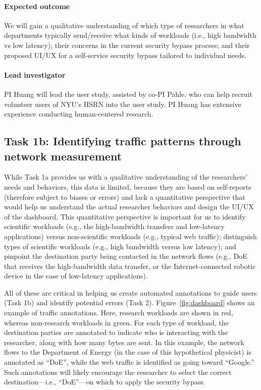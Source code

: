 \paragraph{Expected outcome} We will gain a qualitative understanding of which type of researchers in what departments typically send/receive what kinds of workloads (i.e., high bandwidth vs low latency); their concerns in the current security bypass process; and their proposed UI/UX for a self-service security bypass tailored to individual needs.



\paragraph{Lead investigator}
PI Huang will lead the user study, assisted by co-PI Pahle, who can help recruit volunteer users of NYU's HSRN into the user study. PI Huang has extensive experience conducting human-centered research.










\subsection{Task 1b: Identifying traffic patterns through network measurement}

While Task 1a provides us with a qualitative understanding of the researchers' needs and behaviors, this data is limited, because they are based on self-reports (therefore subject to biases or errors) and lack a quantitative perspective that would help us understand the actual researcher behaviors and design the UI/UX of the dashboard.
This quantitative perspective is important for us to identify scientific workloads (e.g., the high-bandwidth transfers and low-latency applications) versus non-scientific workloads (e.g., typical web traffic); distinguish types of scientific workloads (e.g., high bandwidth versus low latency); and pinpoint the destination party being contacted in the network flows (e.g., DoE that receives the high-bandwidth data transfer, or the Internet-connected robotic device in the case of low-latency applications).

All of these are critical in helping us create automated annotations to guide users (Task 1b) and identify potential errors (Task 2). Figure~\ref{fig:dashboard} shows an example of traffic annotations. Here, research workloads are shown in red, whereas non-research workloads in green. For each type of workload, the destination parties are annotated to indicate who is interacting with the researcher, along with how many bytes are sent. In this example, the network flows to the Department of Energy (in the case of this hypothetical physicist) is annotated as ``DoE'', while the web traffic is identified as going toward ``Google.'' Such annotations will likely encourage the researcher to select the correct destination---i.e., ``DoE''---on which to apply the security bypass.

